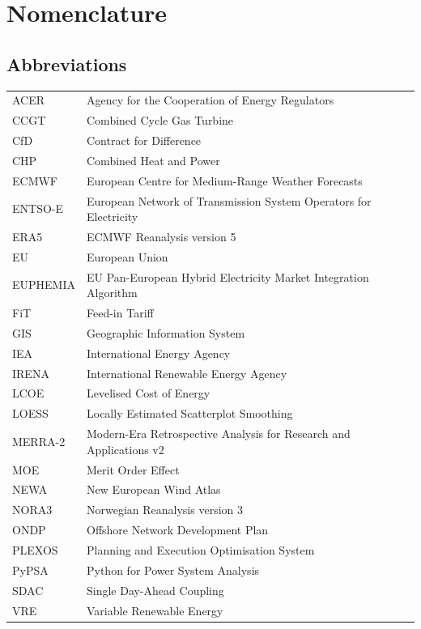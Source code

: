 \documentclass[letterpaper, 11pt]{article}%
\begin{document}
\listoffigures
\thispagestyle{empty}
\newpage

\listoftables
\thispagestyle{empty}
\newpage

\section*{Nomenclature}
\thispagestyle{empty}

\subsection*{Abbreviations}
\begin{tabular}{@{}l l@{}}
ACER & Agency for the Cooperation of Energy Regulators \\
CCGT & Combined Cycle Gas Turbine \\
CfD & Contract for Difference \\
CHP & Combined Heat and Power \\
ECMWF & European Centre for Medium-Range Weather Forecasts \\
ENTSO-E & European Network of Transmission System Operators for Electricity \\
ERA5 & ECMWF Reanalysis version 5 \\
EU & European Union \\
EUPHEMIA & EU Pan-European Hybrid Electricity Market Integration Algorithm \\
FiT & Feed-in Tariff \\
GIS & Geographic Information System \\
IEA & International Energy Agency \\
IRENA & International Renewable Energy Agency \\
LCOE & Levelised Cost of Energy \\
LOESS & Locally Estimated Scatterplot Smoothing \\
MERRA-2 & Modern-Era Retrospective Analysis for Research and Applications v2 \\
MOE & Merit Order Effect \\
NEWA & New European Wind Atlas \\
NORA3 & Norwegian Reanalysis version 3 \\
ONDP & Offshore Network Development Plan \\
PLEXOS & Planning and Execution Optimisation System \\
PyPSA & Python for Power System Analysis \\
SDAC & Single Day-Ahead Coupling \\
VRE & Variable Renewable Energy \\
\end{tabular}
\end{document}
